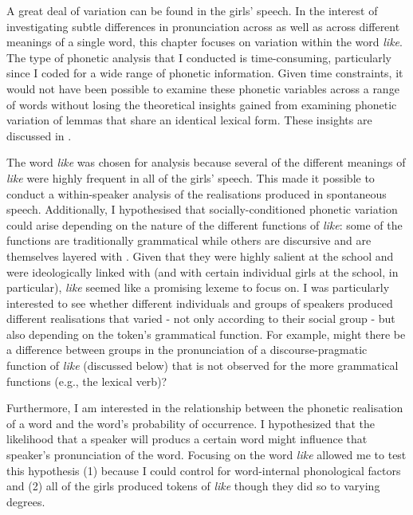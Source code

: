 \noindent A great deal of variation can be found in the girls' speech. In the interest of investigating subtle differences in pronunciation across  as well as across different meanings of a single word, this chapter focuses on variation within the word \textit{like}. The type of phonetic analysis that I conducted is time-consuming, particularly since I coded for a wide range of phonetic information. Given time constraints, it would not have been possible to examine these phonetic variables across a range of words without losing the theoretical insights gained from examining phonetic variation of lemmas that share an identical lexical form. These insights are discussed in .

The word \textit{like} was chosen for analysis because several of the different meanings of \textit{like} were highly frequent in all of the girls' speech. This made it possible to conduct a within-speaker analysis of the realisations produced in spontaneous speech. Additionally, I hypothesised that socially-conditioned phonetic variation could arise depending on the nature of the different functions of \textit{like}: some of the functions are traditionally grammatical while others are discursive and are themselves layered with . Given that they were highly salient at the school and were ideologically linked with  (and with certain individual girls at the school, in particular), \textit{like} seemed like a promising lexeme to focus on. I was particularly interested to see whether different individuals and groups of speakers produced different realisations that varied - not only according to their social group - but also depending on the token's grammatical function. For example, might there be a difference between groups in the pronunciation of a discourse-pragmatic function of \textit{like} (discussed below) that is not observed for the more grammatical functions (e.g., the lexical verb)? 

\largerpage
Furthermore, I am interested in the relationship between the phonetic realisation of a word and the word's probability of occurrence. I hypothesized that the likelihood that a speaker will producs a certain word might influence that speaker's pronunciation of the word. Focusing on the word \textit{like} allowed me to test this hypothesis (1) because I could control for word-internal phonological factors and (2) all of the girls produced tokens of \textit{like} though they did so to varying degrees.

